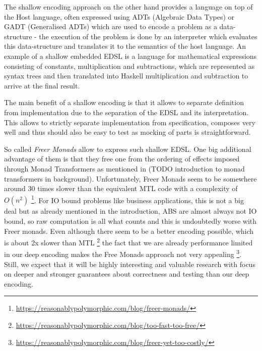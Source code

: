 The shallow encoding approach on the other hand provides a language on top of the Host language, often expressed using ADTs (Algebraic Data Types) or GADT (Generalised ADTs) which are used to encode a problem as a data-structure - the execution of the problem is done by an interpreter which evaluates this data-structure and translates it to the semantics of the host language. An example of a shallow embedded EDSL is a language for mathematical expressions consisting of constants, multiplication and subtractions, which are represented as syntax trees and then translated into Haskell multiplication and subtraction to arrive at the final result.

The main benefit of a shallow encoding is that it allows to separate definition from implementation due to the separation of the EDSL and its interpretation. This allows to strictly separate implementation from specification, composes very well and thus should also be easy to test as mocking of parts is straightforward.

\medskip

So called \textit{Freer Monads} \cite{rivas_notions_2014} allow to express such shallow EDSL. One big additional advantage of them is that they free one from the ordering of effects imposed through Monad Transformers as mentioned in (TODO introduction to monad transformers in background). Unfortunately, Freer Monads seem to be somewhere around 30 times slower than the equivalent MTL code with a complexity of $O(n^2)$ \footnote{\url{https://reasonablypolymorphic.com/blog/freer-monads/}}. For IO bound problems like business applications, this is not a big deal but as already mentioned in the introduction, ABS are almost always not IO bound, so raw computation is all what counts and this is undoubtedly worse with Freer monads. Even although there seem to be a better encoding possible, which is about 2x slower than MTL \footnote{\url{https://reasonablypolymorphic.com/blog/too-fast-too-free/}} the fact that we are already performance limited in our deep encoding makes the Free Monads approach not very appealing \footnote{\url{https://reasonablypolymorphic.com/blog/freer-yet-too-costly/}}. Still, we expect that it will be highly interesting and valuable research with focus on deeper and stronger guarantees about correctness and testing than our deep encoding.


